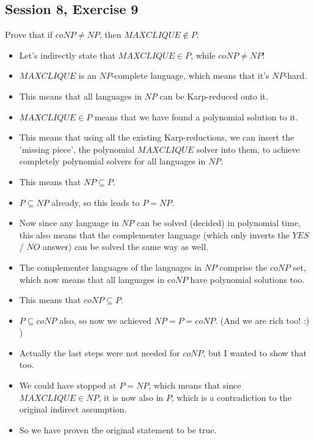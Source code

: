 \subsection {Session 8, Exercise 9}
\label{8f9}


Prove that if $coNP \neq{} NP$, then $MAXCLIQUE \notin{} P$.


\begin{itemize}
    \item Let's indirectly state that $MAXCLIQUE \in{} P$, while $coNP \neq{} NP$!
    \item $MAXCLIQUE$ is an $NP$-complete language, which means that it's $NP$-hard.
    \item This means that all languages in $NP$ can be Karp-reduced onto it.
    \item $MAXCLIQUE \in{} P$ means that we have found a polynomial solution to it.
    \item This means that using all the existing Karp-reductions, we can insert the 'missing piece', the polynomial $MAXCLIQUE$ solver into them, to achieve completely polynomial solvers for all languages in $NP$.
    \item This means that $NP\subseteq{}P$.
    \item $P\subseteq{}NP$ already, so this leads to $P = NP$.
    \item Now since any language in $NP$ can be solved (decided) in polynomial time, this also means that the complementer language (which only inverts the $YES$ / $NO$ answer) can be solved the same way as well.
    \item The complementer languages of the languages in $NP$ comprise the $coNP$ set, which now means that all languages in $coNP$ have polynomial solutions too.
    \item This means that $coNP \subseteq{} P$.
    \item $P\subseteq{}coNP$ also, so now we achieved $NP = P= coNP$. (And we are rich too! :) )
    \item Actually the last steps were not needed for $coNP$, but I wanted to show that too.
    \item We could have stopped at $P = NP$, which means that since $MAXCLIQUE \in{} NP$, it is now also in $P$, which is a contradiction to the original indirect assumption.
    \item So we have proven the original statement to be true.
\end{itemize}
